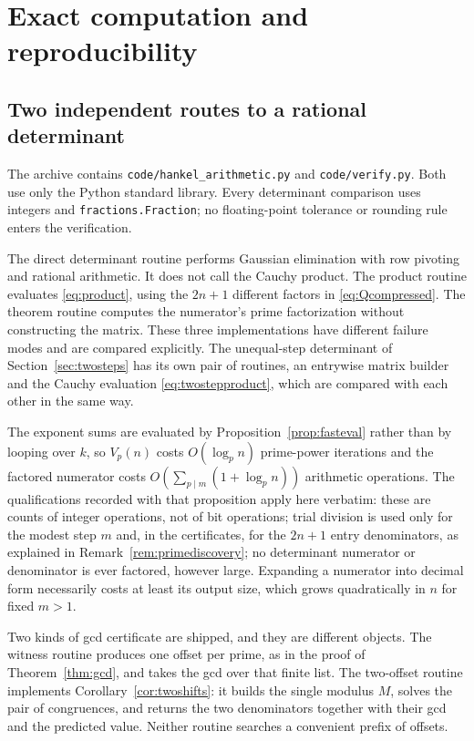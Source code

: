 \documentclass[11pt,a4paper]{article}
\numberwithin{equation}{section}
\theoremstyle{definition}
\theoremstyle{remark}
\begin{document}
\section{Exact computation and reproducibility}\label{sec:computation}

\subsection{Two independent routes to a rational determinant}
The archive contains \texttt{code/hankel\_arithmetic.py} and \texttt{code/verify.py}. Both use only the Python standard library. Every determinant comparison uses integers and \texttt{fractions.Fraction}; no floating-point tolerance or rounding rule enters the verification.

The direct determinant routine performs Gaussian elimination with row pivoting and rational arithmetic. It does not call the Cauchy product. The product routine evaluates \eqref{eq:product}, using the $2n+1$ different factors in \eqref{eq:Qcompressed}. The theorem routine computes the numerator's prime factorization without constructing the matrix. These three implementations have different failure modes and are compared explicitly. The unequal-step determinant of Section~\ref{sec:twosteps} has its own pair of routines, an entrywise matrix builder and the Cauchy evaluation \eqref{eq:twostepproduct}, which are compared with each other in the same way.

The exponent sums are evaluated by Proposition~\ref{prop:fasteval} rather than by looping over $k$, so $V_p(n)$ costs $O(\log_pn)$ prime-power iterations and the factored numerator costs $O(\sum_{p\mid m}(1+\log_pn))$ arithmetic operations. The qualifications recorded with that proposition apply here verbatim: these are counts of integer operations, not of bit operations; trial division is used only for the modest step $m$ and, in the certificates, for the $2n+1$ entry denominators, as explained in Remark~\ref{rem:primediscovery}; no determinant numerator or denominator is ever factored, however large. Expanding a numerator into decimal form necessarily costs at least its output size, which grows quadratically in $n$ for fixed $m>1$.

Two kinds of gcd certificate are shipped, and they are different objects. The witness routine produces one offset per prime, as in the proof of Theorem~\ref{thm:gcd}, and takes the gcd over that finite list. The two-offset routine implements Corollary~\ref{cor:twoshifts}: it builds the single modulus $M$, solves the pair of congruences, and returns the two denominators together with their gcd and the predicted value. Neither routine searches a convenient prefix of offsets.
\end{document}
